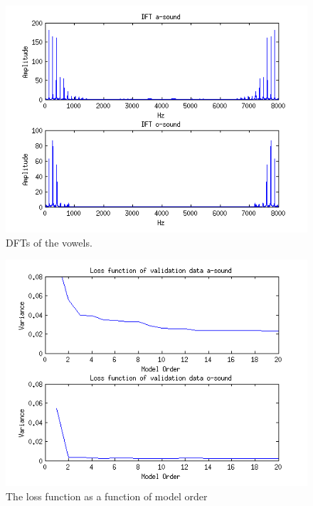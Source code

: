 \documentclass[12pt]{article}
\begin{document}
\begin{figure}[H]
  \centering
  \includegraphics[width=14cm]{vowel_fft.png}
  \caption{
    \label{vowel_DFT}
    DFTs of the vowels.}
\end{figure}

\begin{figure}[H]
  \centering
  \includegraphics[width=14cm]{loss_function_validation.png}
  \caption{
    \label{loss_function}
    The loss function as a function of model order}
\end{figure}
\end{document}
